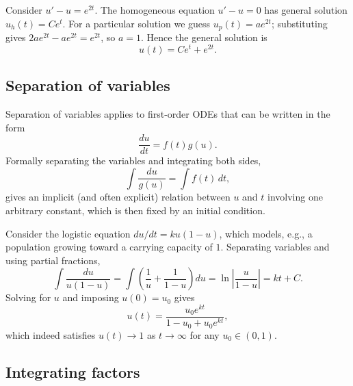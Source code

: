 \begin{example}
    Consider $u' - u = e^{2t}$. The homogeneous equation $u'-u=0$ has
    general solution $u_h(t) = Ce^t$. For a particular solution we
    guess $u_p(t) = ae^{2t}$; substituting gives $2ae^{2t} - ae^{2t} =
    e^{2t}$, so $a=1$. Hence the general solution is
    \begin{equation*}
        u(t) = Ce^t + e^{2t}.
    \end{equation*}
\end{example}

\subsection{Separation of variables}

Separation of variables applies to first-order ODEs that can be
written in the form
\begin{equation*}
    \frac{du}{dt} = f(t) g(u).
\end{equation*}
Formally separating the variables and integrating both sides,
\begin{equation*}
    \int \frac{du}{g(u)} = \int f(t) \, dt,
\end{equation*}
gives an implicit (and often explicit) relation between $u$ and $t$
involving one arbitrary constant, which is then fixed by an initial
condition.

\begin{example}
    Consider the logistic equation $du/dt = ku(1-u)$, which models,
    e.g., a population growing toward a carrying capacity of $1$.
    Separating variables and using partial fractions,
    \begin{equation*}
        \int \frac{du}{u(1-u)} = \int \left( \frac1u + \frac{1}{1-u}
        \right) du = \ln \left| \frac{u}{1-u} \right| = kt + C.
    \end{equation*}
    Solving for $u$ and imposing $u(0) = u_0$ gives
    \begin{equation*}
        u(t) = \frac{u_0 e^{kt}}{1 - u_0 + u_0 e^{kt}},
    \end{equation*}
    which indeed satisfies $u(t) \to 1$ as $t \to \infty$ for any
    $u_0 \in (0,1)$.
\end{example}

\subsection{Integrating factors}

